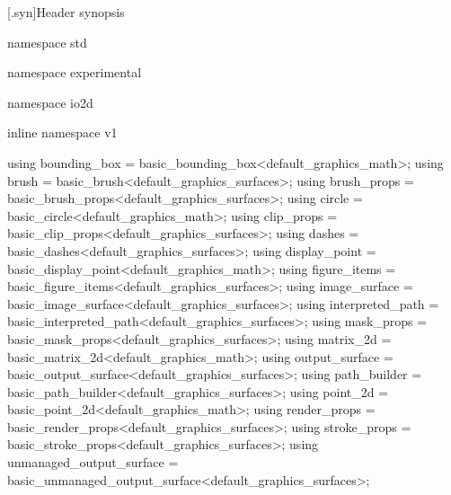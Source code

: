 [\iotwod.syn]{Header  synopsis}

%
%
\begin{codeblock}

namespace std { namespace experimental {
  namespace io2d { inline namespace v1 {
  		
  using bounding_box = basic_bounding_box<default_graphics_math>;
  using brush = basic_brush<default_graphics_surfaces>;
  using brush_props = basic_brush_props<default_graphics_surfaces>;
  using circle = basic_circle<default_graphics_math>;
  using clip_props = basic_clip_props<default_graphics_surfaces>;
  using dashes = basic_dashes<default_graphics_surfaces>;
  using display_point = basic_display_point<default_graphics_math>;
  using figure_items = basic_figure_items<default_graphics_surfaces>;
  using image_surface = basic_image_surface<default_graphics_surfaces>;
  using interpreted_path = basic_interpreted_path<default_graphics_surfaces>;
  using mask_props = basic_mask_props<default_graphics_surfaces>;
  using matrix_2d = basic_matrix_2d<default_graphics_math>;
  using output_surface = basic_output_surface<default_graphics_surfaces>;
  using path_builder = basic_path_builder<default_graphics_surfaces>;
  using point_2d = basic_point_2d<default_graphics_math>;
  using render_props = basic_render_props<default_graphics_surfaces>;
  using stroke_props = basic_stroke_props<default_graphics_surfaces>;
  using unmanaged_output_surface = basic_unmanaged_output_surface<default_graphics_surfaces>;
} } } }

\end{codeblock}
%
